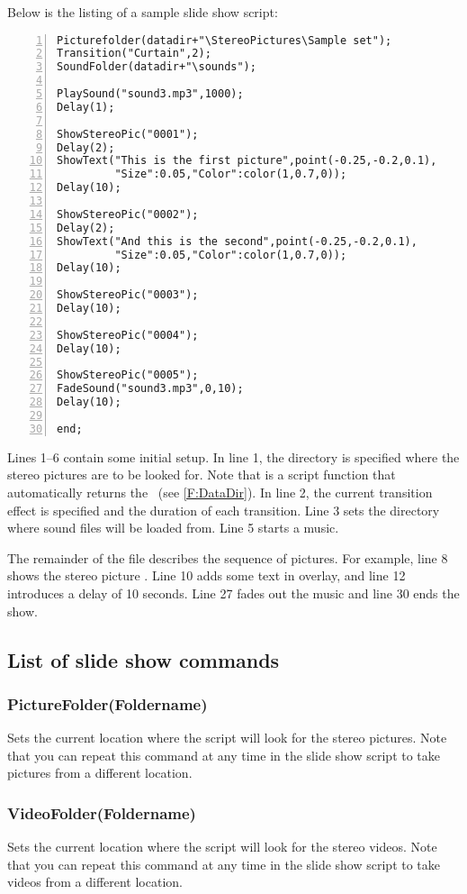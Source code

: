Below is the listing of a sample slide show script:

\begin{lstlisting}[numbers=left]
Picturefolder(datadir+"\StereoPictures\Sample set");
Transition("Curtain",2);
SoundFolder(datadir+"\sounds");

PlaySound("sound3.mp3",1000);
Delay(1);

ShowStereoPic("0001");
Delay(2);
ShowText("This is the first picture",point(-0.25,-0.2,0.1),
         "Size":0.05,"Color":color(1,0.7,0));
Delay(10);

ShowStereoPic("0002");
Delay(2);
ShowText("And this is the second",point(-0.25,-0.2,0.1),
         "Size":0.05,"Color":color(1,0.7,0));
Delay(10);

ShowStereoPic("0003");
Delay(10);

ShowStereoPic("0004");
Delay(10);

ShowStereoPic("0005");
FadeSound("sound3.mp3",0,10);
Delay(10);

end;
\end{lstlisting}

Lines 1--6 contain some initial setup. In line 1, the directory is specified where the stereo pictures are to be looked for. Note that  is a script function that automatically returns the \datadir\ (see \ref{F:DataDir}). In line 2, the current transition effect is specified and the duration of each transition. Line 3 sets the directory where sound files will be loaded from. Line 5 starts a music.

The remainder of the file describes the sequence of pictures. For example, line 8 shows the stereo picture . Line 10 adds some text in overlay, and line 12 introduces a delay of 10 seconds. Line 27 fades out the music and line 30 ends the show.

\subsection{List of slide show commands}

\subsubsection{PictureFolder(Foldername)}
Sets the current location where the script will look for the stereo pictures. Note that you can repeat this command at any time in the slide show script to take pictures from a different location.

\subsubsection{VideoFolder(Foldername)}
Sets the current location where the script will look for the stereo videos. Note that you can repeat this command at any time in the slide show script to take videos from a different location.

